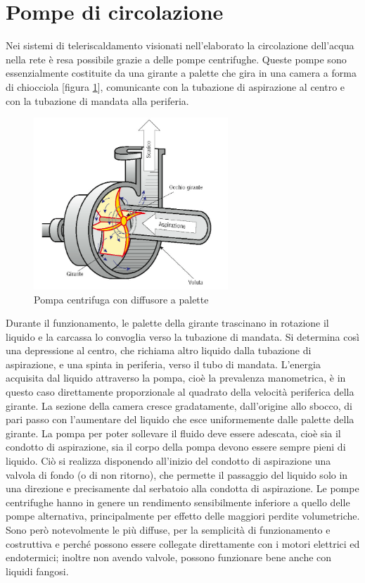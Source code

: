 \documentclass[laurea,oneside,11pt]{USiena_tesiLM}
\begin{document}
\section{Pompe di circolazione}
Nei sistemi di teleriscaldamento visionati nell'elaborato la circolazione dell'acqua nella rete è resa possibile grazie a delle pompe centrifughe. Queste pompe sono essenzialmente costituite da una girante a palette che gira in una camera a forma di chiocciola [figura \ref{fig:pompa_centrifuga}], comunicante con la tubazione di aspirazione al centro e con la tubazione di mandata alla periferia.

\begin{figure}[h]
\centering
\includegraphics[width=0.65\textwidth]{figure/pompa_centrifuga} 
\caption{Pompa centrifuga con diffusore a palette}
\label{fig:pompa_centrifuga}
\end{figure}

Durante il funzionamento, le palette della girante trascinano in rotazione il liquido e la carcassa lo convoglia verso la tubazione di mandata.
Si determina così una depressione al centro, che richiama altro liquido dalla tubazione di aspirazione, e una spinta in periferia, verso il tubo di mandata.
L'energia acquisita dal liquido attraverso la pompa, cioè la prevalenza manometrica, è in questo caso direttamente proporzionale al quadrato della velocità periferica della girante.
La sezione della camera cresce gradatamente, dall'origine allo sbocco, di pari passo con l'aumentare del liquido che esce uniformemente dalle palette della girante.
La pompa per poter sollevare il fluido deve
essere adescata, cioè sia il condotto di
aspirazione, sia il corpo della pompa devono essere sempre pieni di liquido. Ciò si realizza disponendo all'inizio del condotto di aspirazione una valvola di fondo (o di non ritorno), che permette il passaggio del liquido solo in una direzione e precisamente dal serbatoio alla condotta di aspirazione.
Le pompe centrifughe hanno in genere un rendimento sensibilmente inferiore a quello delle pompe alternativa, principalmente per effetto delle maggiori perdite volumetriche. Sono però notevolmente le più diffuse, per la semplicità di funzionamento e costruttiva e perché possono essere collegate direttamente con i motori elettrici ed endotermici; inoltre non avendo valvole, possono funzionare bene anche con liquidi fangosi.
\end{document}
